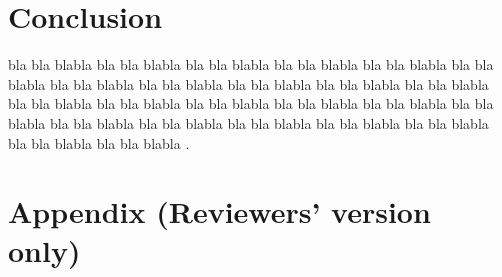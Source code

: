 \documentclass[a4paper,10pt]{llncs}
\begin{document}

\section{Conclusion}
\label{section:Conclusion}

bla bla blabla bla bla blabla bla bla blabla bla bla blabla bla bla blabla 
bla bla blabla bla bla blabla bla bla blabla bla bla blabla bla bla blabla 
bla bla blabla bla bla blabla bla bla blabla bla bla blabla bla bla blabla 
bla bla blabla bla bla blabla bla bla blabla bla bla blabla bla bla blabla 
bla bla blabla bla bla blabla bla bla blabla bla bla blabla .







\newpage
\section*{Appendix (Reviewers' version only)}


\end{document}
